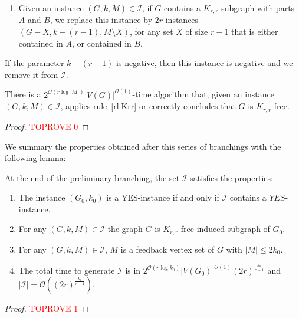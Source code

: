 \documentclass{amsart}
\newcommand{\BR}[1]{BR$_ #1$}
\newcommand{\I}{\mathcal{I}}
\newcommand{\ruleref}[1]{\hyperref[#1]{\ref*{#1}}}
\renewcommand{\O}{\mathcal{O}}
\begin{document}
\begin{enumerate}[label=(\BR{{\arabic*}})]
\setcounter{enumi}{0}
\item \label{rl:Krr} Given an instance $(G, k, M)\in \I$, if $G$ contains a $K_{r,r}$-subgraph with parts $A$ and $B$, we replace this instance by $2r$ instances $(G -  X, k-(r-1), M\setminus X)$, for any set $X$ of size $r-1$ that is either contained in $A$, or contained in $B$.
\end{enumerate}
\begin{remark}
  If the parameter $k-(r-1)$ is negative, then this instance is negative and we remove it from $\I$.
\end{remark}
\begin{lemma}\label{lem:findkrr}
   There is a  $2^{\O\left (r\log |M| \right )}|V(G)|^{\O(1)}$-time algorithm that, given an instance $(G, k, M)\in \I$, applies rule~\ruleref{rl:Krr} or correctly concludes that $G$ is $K_{r,r}$-free.
\end{lemma}
\begin{proof}\textcolor{red}{TOPROVE 0}\end{proof}

We summary the properties obtained after this series of branchings with the following lemma:
\begin{lemma}\label{lem:step2}
    At the end of the preliminary branching, the set $\I$ satisfies the properties:
    \begin{enumerate}
        \item The instance $(G_0, k_0)$ is a YES-instance if and only if $\I$ contains a $YES$-instance.
        \item For any $(G,k,M)\in \I$ the graph $G$ is $K_{r,r}$-free induced subgraph of $G_0$.
        \item For any $(G,k,M)\in \I$, $M$ is a feedback vertex set of $G$ with $|M|\leq 2k_0$.
        \item The total time to generate $\I$ is in $2^{\O\left (r\log k_0 \right )}|V(G_0)|^{\O(1)}(2r)^{\frac{k_0}{r-1}}$
        and $|\I|=\O\left((2r)^{\frac{k_0}{r-1}}\right)$.
    \end{enumerate}
\end{lemma}
\begin{proof}\textcolor{red}{TOPROVE 1}\end{proof}
\end{document}
